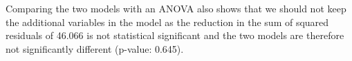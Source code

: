 \documentclass[10pt,a4paper]{article}
\begin{document}
Comparing the two models with an ANOVA also shows that we should not keep the additional variables in the model as the reduction in the sum of squared residuals of 46.066 is not statistical significant and the two models are therefore not significantly different (p-value: 0.645).\\




 

\end{document}
